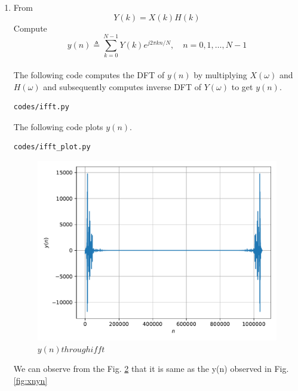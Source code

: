 \documentclass[journal,12pt,twocolumn]{IEEEtran}
\renewcommand\thesection{\arabic{section}}
\begin{document}
\begin{enumerate}[label=\thesection.\arabic*
,ref=\thesection.\theenumi]
\begin{figure}[!ht]
\caption{$X(k) and H(k)$}
\label{fig:xnhnfft}
\end{figure}
\item From
\begin{equation}
Y(k) = X(k)H(k)
\end{equation}
Compute
\begin{equation}
y(n) \triangleq \sum_{k=0}^{N-1} Y(k) e^{j 2 \pi k n / N}, \quad n=0,1, \ldots, N-1
\end{equation}
\\
\solution
The following code computes the DFT of $y(n)$ by multiplying $X(\omega)$ and $H(\omega)$ and subsequently computes inverse DFT of $Y(\omega)$ to get $y(n)$.
\begin{lstlisting}
codes/ifft.py
\end{lstlisting}
The following code plots $y(n)$.
\begin{lstlisting}
codes/ifft_plot.py
\end{lstlisting}
\begin{figure}[!ht]
\centering
\includegraphics[width=\columnwidth]{./figs/ifft}
\caption{$y(n) through ifft$}
\label{fig:ynfft}
\end{figure}
We can observe from the Fig. \ref{fig:ynfft} that it is same as the y(n) observed in Fig.\ref{fig:xnyn}
\end{enumerate}
\end{document}
